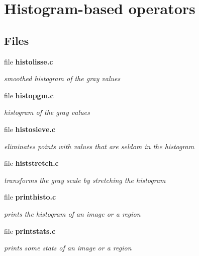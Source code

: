 \section{Histogram-based operators}
\label{group__histo}
\subsection*{Files}
\begin{CompactItemize}
\item 
file {\bf histolisse.c}
\begin{CompactList}\small\item\em smoothed histogram of the gray values \item\end{CompactList}

\item 
file {\bf histopgm.c}
\begin{CompactList}\small\item\em histogram of the gray values \item\end{CompactList}

\item 
file {\bf histosieve.c}
\begin{CompactList}\small\item\em eliminates points with values that are seldom in the histogram \item\end{CompactList}

\item 
file {\bf histstretch.c}
\begin{CompactList}\small\item\em transforms the gray scale by stretching the histogram \item\end{CompactList}

\item 
file {\bf printhisto.c}
\begin{CompactList}\small\item\em prints the histogram of an image or a region \item\end{CompactList}

\item 
file {\bf printstats.c}
\begin{CompactList}\small\item\em prints some stats of an image or a region \item\end{CompactList}

\end{CompactItemize}
